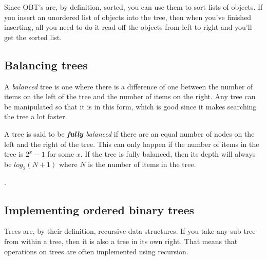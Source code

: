 Since OBT's are, by definition, sorted, you can use them to sort lists of
objects. If you insert an unordered list of objects into the tree, then when
you've finished inserting, all you need to do it read off the objects from left
to right and you'll get the sorted list.

\subsection*{Balancing trees}

A {\it balanced} tree is one where there is a difference of one between the
number of items on the left of the tree and the number of items on the right.
Any tree can be manipulated so that it is in this form, which is good since it
makes searching the tree a lot faster.

A tree is said to be {\it {\bf fully} balanced} if there are an equal number of
nodes on the left and the right of the tree. This can only happen if the number
of items in the tree is $2^x - 1$ for some $x$. If the tree is fully balanced,
then its depth will always be $log_2(N + 1)$ where $N$ is the number of items
in the tree.

.

\subsection*{Implementing ordered binary trees}

Trees are, by their definition, recursive data structures. If you take any sub
tree from within a tree, then it is also a tree in its own right. That means
that operations on trees are often implemented using recursion.

